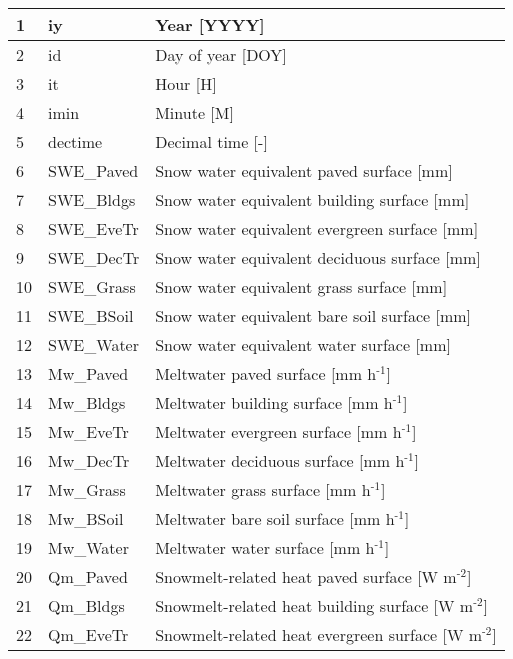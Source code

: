 \documentclass[letterpaper,10pt,english]{sphinxmanual}
\begin{document}
\begin{savenotes}
\begin{longtable}{|l|l|l|}
1
&
iy
&
Year {[}YYYY{]}
\\
\hline
2
&
id
&
Day of year {[}DOY{]}
\\
\hline
3
&
it
&
Hour {[}H{]}
\\
\hline
4
&
imin
&
Minute {[}M{]}
\\
\hline
5
&
dectime
&
Decimal time {[}-{]}
\\
\hline
6
&
SWE\_Paved
&
Snow water equivalent
\textendash{} paved surface {[}mm{]}
\\
\hline
7
&
SWE\_Bldgs
&
Snow water equivalent
\textendash{} building surface
{[}mm{]}
\\
\hline
8
&
SWE\_EveTr
&
Snow water equivalent
\textendash{} evergreen surface
{[}mm{]}
\\
\hline
9
&
SWE\_DecTr
&
Snow water equivalent
\textendash{} deciduous surface
{[}mm{]}
\\
\hline
10
&
SWE\_Grass
&
Snow water equivalent
\textendash{} grass surface {[}mm{]}
\\
\hline
11
&
SWE\_BSoil
&
Snow water equivalent
\textendash{} bare soil surface
{[}mm{]}
\\
\hline
12
&
SWE\_Water
&
Snow water equivalent
\textendash{} water surface {[}mm{]}
\\
\hline
13
&
Mw\_Paved
&
Meltwater \textendash{} paved
surface {[}mm
h$^{\text{-1}}${]}
\\
\hline
14
&
Mw\_Bldgs
&
Meltwater \textendash{} building
surface {[}mm
h$^{\text{-1}}${]}
\\
\hline
15
&
Mw\_EveTr
&
Meltwater \textendash{} evergreen
surface {[}mm
h$^{\text{-1}}${]}
\\
\hline
16
&
Mw\_DecTr
&
Meltwater \textendash{} deciduous
surface {[}mm
h$^{\text{-1}}${]}
\\
\hline
17
&
Mw\_Grass
&
Meltwater \textendash{} grass
surface {[}mm
h$^{\text{-1}}${]}
\\
\hline
18
&
Mw\_BSoil
&
Meltwater \textendash{} bare soil
surface {[}mm
h$^{\text{-1}}${]}
\\
\hline
19
&
Mw\_Water
&
Meltwater \textendash{} water
surface {[}mm
h$^{\text{-1}}${]}
\\
\hline
20
&
Qm\_Paved
&
Snowmelt-related heat
\textendash{} paved surface {[}W
m$^{\text{-2}}${]}
\\
\hline
21
&
Qm\_Bldgs
&
Snowmelt-related heat
\textendash{} building surface {[}W
m$^{\text{-2}}${]}
\\
\hline
22
&
Qm\_EveTr
&
Snowmelt-related heat
\textendash{} evergreen surface
{[}W m$^{\text{-2}}${]}
\\

\end{longtable}
\end{savenotes}
\end{document}
